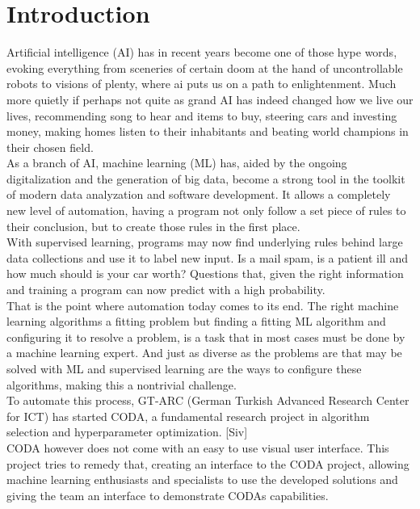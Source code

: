 \chapter{Introduction}

Artificial intelligence (AI) has in recent years become one of those hype words, evoking everything from sceneries of certain doom at the hand of uncontrollable robots to visions of plenty, where ai puts us on a path to enlightenment. Much more quietly if perhaps not quite as grand AI has indeed changed how we live our lives, recommending song to hear and items to buy, steering cars and investing money, making homes listen to their inhabitants and beating world champions in their chosen field.\\
As a branch of AI, machine learning (ML) has, aided by the ongoing digitalization and the generation of big data, become a strong tool in the toolkit of modern data analyzation and software development. It allows a completely new level of automation, having a program not only follow a set piece of rules to their conclusion, but to create those rules in the first place. \\
With supervised learning, programs may now find underlying rules behind large data collections and use it to label new input. Is a mail spam, is a patient ill and how much should is your car worth? Questions that, given the right information and training a program can now predict with a high probability.\\
That is the point where automation today comes to its end. The right machine learning algorithms a fitting problem but finding a fitting ML algorithm and configuring it to resolve a problem, is a task that in most cases must be done by a machine learning expert. And just as diverse as the problems are that may be solved with ML and supervised learning are the ways to configure these algorithms, making this a nontrivial challenge. \\
To automate this process, GT-ARC (German Turkish Advanced Research Center for ICT) has started CODA, a fundamental research project in algorithm selection and hyperparameter optimization. [Siv]  \\
CODA however does not come with an easy to use visual user interface. This project tries to remedy that, creating an interface to the CODA project, allowing machine learning enthusiasts and specialists to use the developed solutions and giving the team an interface to demonstrate CODAs capabilities. 


